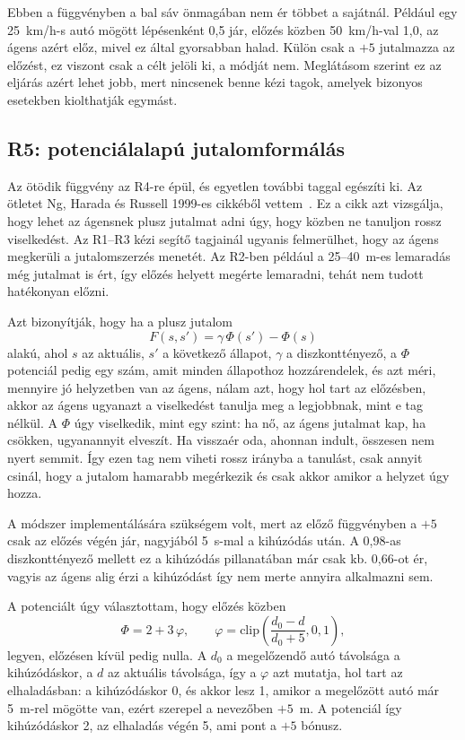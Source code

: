 \documentclass[a4paper,12pt,oneside]{article}
\begin{document}
Ebben a függvényben a bal sáv önmagában nem ér többet a sajátnál. Például 
egy 25~km/h-s autó mögött lépésenként 0,5 jár, előzés közben 50~km/h-val 1,0, 
az ágens azért előz, mivel ez által 
gyorsabban halad. Külön csak a $+5$ jutalmazza az előzést, ez viszont csak a célt jelöli ki,
a módját nem. Meglátásom szerint ez az eljárás azért lehet jobb, mert nincsenek benne kézi tagok, amelyek bizonyos esetekben kiolthatják egymást.

\subsection{R5: potenciálalapú jutalomformálás}
\label{subsec:reward5}

Az ötödik függvény az R4-re épül, és egyetlen további taggal egészíti ki. 
Az ötletet Ng, Harada és Russell 1999-es
cikkéből vettem~\cite{ng1999}. Ez a cikk azt vizsgálja,
hogy lehet az ágensnek plusz jutalmat adni úgy, hogy közben ne tanuljon rossz
viselkedést. Az R1--R3 kézi segítő tagjainál ugyanis felmerülhet, hogy az ágens megkerüli a jutalomszerzés menetét. Az
R2-ben például a 25--40~m-es lemaradás még jutalmat is ért, így előzés helyett megérte
lemaradni, tehát nem tudott hatékonyan előzni.

Azt bizonyítják, hogy ha a plusz jutalom
\begin{equation}
  F(s, s') = \gamma\,\Phi(s') - \Phi(s)
  \label{eq:shaping}
\end{equation}
alakú, ahol $s$ az aktuális, $s'$ a következő állapot, $\gamma$ a diszkonttényező, a $\Phi$
potenciál pedig egy szám, amit minden állapothoz hozzárendelek, és azt méri, mennyire jó
helyzetben van az ágens, nálam azt, hogy hol tart az előzésben, akkor az ágens ugyanazt a
viselkedést tanulja meg a legjobbnak, mint e tag nélkül. A $\Phi$ úgy viselkedik, mint egy szint: ha nő, az
ágens jutalmat kap, ha csökken, ugyanannyit elveszít. Ha visszaér oda, ahonnan indult,
összesen nem nyert semmit. 
Így ezen tag nem viheti rossz irányba a tanulást, csak annyit csinál, hogy a
jutalom hamarabb megérkezik és csak akkor amikor a helyzet úgy hozza.

A módszer implementálására szükségem volt, mert az előző függvényben a $+5$ csak az előzés végén jár, nagyjából 5~s-mal
a kihúzódás után. A 0,98-as diszkonttényező mellett ez a kihúzódás pillanatában már csak kb.
0,66-ot ér, vagyis az ágens alig érzi a kihúzódást így nem merte annyira alkalmazni sem.

A potenciált úgy választottam, hogy előzés közben
\begin{equation}
  \Phi = 2 + 3\,\varphi, \qquad
  \varphi = \mathrm{clip}\!\left(\frac{d_0 - d}{d_0 + 5}, 0, 1\right),
  \label{eq:phi}
\end{equation}
legyen, előzésen kívül pedig nulla. A $d_0$ a megelőzendő autó távolsága a kihúzódáskor,
a $d$ az aktuális távolsága, így a $\varphi$ azt mutatja, hol tart az elhaladásban: a
kihúzódáskor 0, és akkor lesz 1, amikor a megelőzött autó már 5~m-rel mögötte van, ezért
szerepel a nevezőben $+5$~m. A potenciál így kihúzódáskor 2, az elhaladás végén 5, ami
pont a $+5$ bónusz. 
\end{document}
